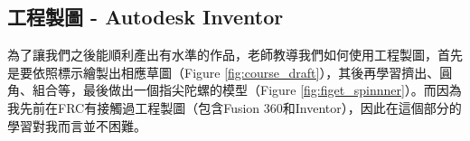 \documentclass[12pt,a4paper]{article}
\title{\Title}
\author{\Author}
\date{\Date}
\newcommand{\Author}{巫玟槿}
\newcommand{\Date}{民國113年2月4日}
\begin{document}
\begin{CJK*}{UTF8}{bkai}
    \pagestyle{fancy}
    \fancyhead[LO,L]{\Author}
    \fancyhead[RO,R]{\Date}
    \fancyfoot[LO,L]{}
    \fancyfoot[CO,C]{\thepage}
    \fancyfoot[RO,R]{}
    \renewcommand{\headrulewidth}{0.4pt}
    \renewcommand{\footrulewidth}{0.4pt}

    \maketitle
    \thispagestyle{empty}
    \newpage


    \renewcommand{\abstractnamefont}{\normalfont\Large\bfseries}
    \begin{abstract}
        本文首先介紹了工程製圖的學習過程，包括使用Autodesk Inventor軟體繪製草圖和製作模型。接著，文中敘述了基礎電學的學習內容，涵蓋了N型與P型半導體的差異、電晶體原理、達靈頓電路等知識。

        而後則是無刷馬達的專題製作，此專案的主要目標是設計並製作一個在25W轉速達10000rpm的馬達，並且深入了解各種影響轉速的參數以及電子元件的原理。文中詳細地記錄了專案的分工、進度表、資料搜集、零件清單（BOM表）等詳細信息。在製作過程中，作者參與了馬達的3D建模、控制電路設計與製作，並進行了調校分析，以優化馬達的性能。最終，團隊通過實際測試證明其效能，成功製作出25W轉速高達15000rpm的馬達。

        最後，作者反思了整個學習過程，表示透過這次專題，不僅對無刷馬達的設計和製作有了深入的了解，也對電子、電路學等領域產生了更多興趣。文章同時也提及作者利用這次機會學習了\LaTeX 排版技巧，為未來的學術研究打下基礎。
    \end{abstract}

    \newpage

    \tableofcontents

    \newpage


    \section{工程製圖 - Autodesk Inventor}
    為了讓我們之後能順利產出有水準的作品，老師教導我們如何使用工程製圖，首先是要依照標示繪製出相應草圖（Figure \ref{fig:course_draft}），其後再學習擠出、圓角、組合等，最後做出一個指尖陀螺的模型（Figure \ref{fig:figet_spinnner}）。而因為我先前在FRC有接觸過工程製圖（包含Fusion 360和Inventor），因此在這個部分的學習對我而言並不困難。


\end{CJK*}
\end{document}
